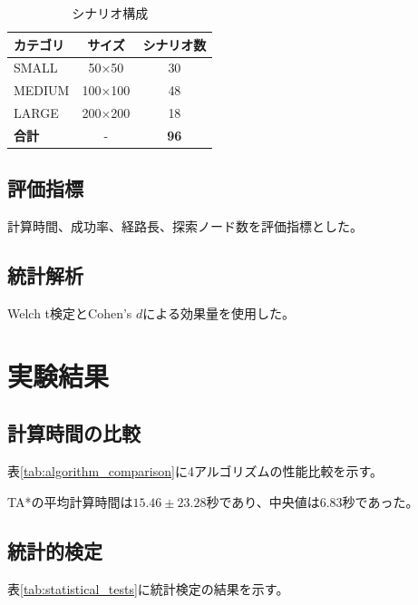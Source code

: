\documentclass[12pt,a4paper]{article}
\begin{document}
\begin{table}[htbp]
\centering
\caption{シナリオ構成}
\label{tab:scenario_config}
\begin{tabular}{lcc}
\toprule
カテゴリ & サイズ & シナリオ数 \\
\midrule
SMALL   & 50×50   & 30 \\
MEDIUM  & 100×100 & 48 \\
LARGE   & 200×200 & 18 \\
\midrule
\textbf{合計} & - & \textbf{96} \\
\bottomrule
\end{tabular}
\end{table}

\subsection{評価指標}

計算時間、成功率、経路長、探索ノード数を評価指標とした。

\subsection{統計解析}

Welch t検定とCohen's $d$による効果量を使用した。

\section{実験結果}


\subsection{計算時間の比較}

表\ref{tab:algorithm_comparison}に4アルゴリズムの性能比較を示す。



TA*の平均計算時間は$15.46 \pm 23.28$秒であり、中央値は6.83秒であった。

\subsection{統計的検定}

表\ref{tab:statistical_tests}に統計検定の結果を示す。
\end{document}
